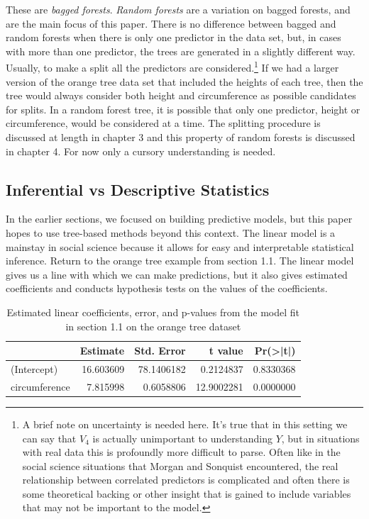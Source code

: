 \documentclass[12pt,twoside]{reedthesis}
\begin{document}
  These are \emph{bagged forests}. \emph{Random forests} are a variation
  on bagged forests, and are the main focus of this paper. There is no
  difference between bagged and random forests when there is only one
  predictor in the data set, but, in cases with more than one predictor,
  the trees are generated in a slightly different way. Usually, to make a
  split all the predictors are considered.\footnote{A brief note on
    uncertainty is needed here. It's true that in this setting we can say
    that \(V_4\) is actually unimportant to understanding \(Y\), but in
    situations with real data this is profoundly more difficult to parse.
    Often like in the social science situations that Morgan and Sonquist
    encountered, the real relationship between correlated predictors is
    complicated and often there is some theoretical backing or other
    insight that is gained to include variables that may not be important
    to the model.} If we had a larger version of the orange tree data set
  that included the heights of each tree, then the tree would always
  consider both height and circumference as possible candidates for
  splits. In a random forest tree, it is possible that only one predictor,
  height or circumference, would be considered at a time. The splitting
  procedure is discussed at length in chapter 3 and this property of
  random forests is discussed in chapter 4. For now only a cursory
  understanding is needed.
  
  \subsection{Inferential vs Descriptive
  Statistics}\label{inferential-vs-descriptive-statistics}
  
  In the earlier sections, we focused on building predictive models, but
  this paper hopes to use tree-based methods beyond this context. The
  linear model is a mainstay in social science because it allows for easy
  and interpretable statistical inference. Return to the orange tree
  example from section 1.1. The linear model gives us a line with which we
  can make predictions, but it also gives estimated coefficients and
  conducts hypothesis tests on the values of the coefficients.
  
  \begin{table}
  
  \caption{\label{tab:unnamed-chunk-11}\label{tab:tablmcoef}Estimated linear coefficients, error, and p-values from the model fit in section 1.1 on the orange tree dataset}
  \centering
  \begin{tabular}[t]{l|r|r|r|r}
  \hline
    & Estimate & Std. Error & t value & Pr(>|t|)\\
  \hline
  (Intercept) & 16.603609 & 78.1406182 & 0.2124837 & 0.8330368\\
  \hline
  circumference & 7.815998 & 0.6058806 & 12.9002281 & 0.0000000\\
  \hline
  \end{tabular}
  \end{table}
  
\end{document}

